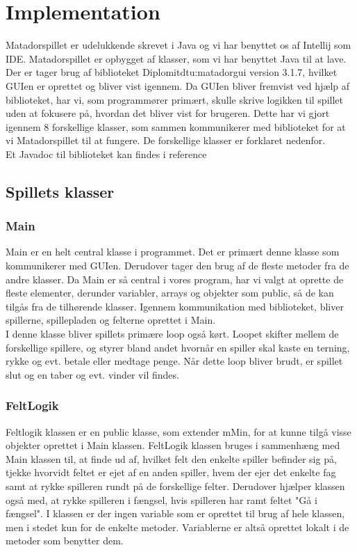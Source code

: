 \section{Implementation}
Matadorspillet er udelukkende skrevet i Java og vi har benyttet os af Intellij som IDE. Matadorspillet er opbygget af klasser, som vi har benyttet Java til at lave. \\
Der er tager brug af biblioteket Diplomitdtu:matadorgui version 3.1.7, hvilket GUIen er oprettet og bliver vist igennem. Da GUIen bliver fremvist ved hjælp af biblioteket, har vi, som programmører primært, skulle skrive logikken til spillet uden at fokusere på, hvordan det bliver vist for brugeren. Dette har vi gjort igennem 8 forskellige klasser, som sammen kommunikerer med biblioteket for at vi Matadorspillet til at fungere.
De forskellige klasser er forklaret nedenfor.\\
Et Javadoc til biblioteket kan findes i reference 
\\

\subsection{Spillets klasser}

\subsubsection{Main}
Main er en helt central klasse i programmet. Det er primært denne klasse som kommunikerer med GUIen. Derudover tager den brug af de fleste metoder fra de andre klasser. Da Main er så central i vores program, har vi valgt at oprette de fleste elementer, derunder variabler, arrays og objekter som public, så de kan tilgås fra de tilhørende klasser. Igennem kommunikation med biblioteket, bliver spillerne, spillepladen og felterne oprettet i Main.\\
I denne klasse bliver spillets primære loop også kørt. Loopet skifter mellem de forskellige spillere, og styrer bland andet hvornår en spiller skal kaste en terning, rykke og evt. betale eller medtage penge. Når dette loop bliver brudt, er spillet slut og en taber og evt. vinder vil findes.

\subsubsection{FeltLogik}
Feltlogik klassen er en public klasse, som extender mMin, for at kunne tilgå visse objekter oprettet i Main klassen. FeltLogik klassen bruges i sammenhæng med Main klassen til, at finde ud af, hvilket felt den enkelte spiller befinder sig på, tjekke hvorvidt feltet er ejet af en anden spiller, hvem der ejer det enkelte fag samt at rykke spilleren rundt på de forskellige felter. Derudover hjælper klassen også med, at rykke spilleren i fængsel, hvis spilleren har ramt feltet "Gå i fængsel". I klassen er der ingen variable som er oprettet til brug af hele klassen, men i stedet kun for de enkelte metoder. Variablerne er altså oprettet lokalt i de metoder som benytter dem.

